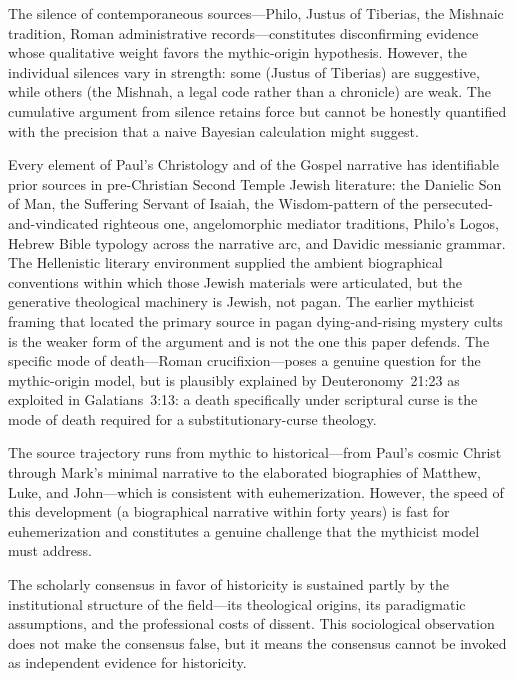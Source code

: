 \documentclass[12pt,oneside]{article}
\begin{document}
The silence of contemporaneous sources---Philo, Justus of Tiberias, the
Mishnaic tradition, Roman administrative records---constitutes
disconfirming evidence whose qualitative weight favors the mythic-origin
hypothesis.  However, the individual silences vary in strength: some
(Justus of Tiberias) are suggestive, while others (the Mishnah, a legal
code rather than a chronicle) are weak.  The cumulative argument from
silence retains force but cannot be honestly quantified with the
precision that a naive Bayesian calculation might suggest.

Every element of Paul's Christology and of the Gospel narrative has
identifiable prior sources in pre-Christian Second Temple Jewish
literature: the Danielic Son of Man, the Suffering Servant of Isaiah,
the Wisdom-pattern of the persecuted-and-vindicated righteous one,
angelomorphic mediator traditions, Philo's Logos, Hebrew Bible
typology across the narrative arc, and Davidic messianic grammar.
The Hellenistic literary environment supplied the ambient biographical
conventions within which those Jewish materials were articulated, but
the generative theological machinery is Jewish, not pagan.  The
earlier mythicist framing that located the primary source in pagan
dying-and-rising mystery cults is the weaker form of the argument and
is not the one this paper defends.  The specific mode of death---Roman
crucifixion---poses a genuine question for the mythic-origin model, but
is plausibly explained by Deuteronomy~21:23 as exploited in
Galatians~3:13: a death specifically under scriptural curse is the
mode of death required for a substitutionary-curse theology.

The source trajectory runs from mythic to historical---from Paul's
cosmic Christ through Mark's minimal narrative to the elaborated
biographies of Matthew, Luke, and John---which is consistent with
euhemerization.  However, the speed of this development (a biographical
narrative within forty years) is fast for euhemerization and constitutes
a genuine challenge that the mythicist model must address.

The scholarly consensus in favor of historicity is sustained partly by
the institutional structure of the field---its theological origins, its
paradigmatic assumptions, and the professional costs of dissent.  This
sociological observation does not make the consensus false, but it means
the consensus cannot be invoked as independent evidence for historicity.

\vspace{1em}
\end{document}
